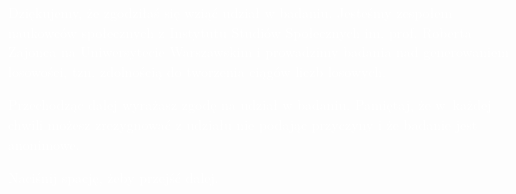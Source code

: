 \documentclass[12pt, crop,varwidth,border=3pt,convert={density=300,outext=.png}]{standalone}
\begin{document}
\textcolor{white}{Dziękujemy, że zgodziłaś się wziąć udział w badaniu. Jesteśmy zespołem naukowców społecznych z Instytutu Studiów Społecznych im. prof. Roberta Zajonca na Uniwersytecie Warszawskim i prowadzimy badania nad generowaniem losowości, tzn. zdolnością do tworzenia ciągów liczb losowych. }
\newline

\textcolor{white}{Przechodząc dalej wyrażasz zgodę na udział w badaniu. Pamiętaj, że w~każdej chwili możesz zrezygnować z udziału nie podając przyczyny i że badanie jest anonimowe.}
\newline

\begin{center}
\textcolor{white}{\Large Naciśnij spację, żeby przejść dalej.}
\end{center}
\end{document}
